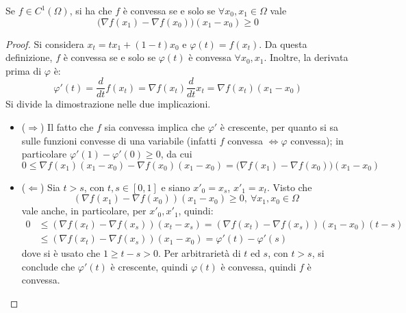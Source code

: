 \documentclass[11pt, a4paper]{scrartcl}
\theoremstyle{definition}
\numberwithin{esempio}{section}
\theoremstyle{definition}
\numberwithin{obs}{section}
\numberwithin{nota}{section}
\numberwithin{equation}{subsection}
\begin{document}
\begin{teorema}
	{}{}
	Se $f \in C^1(\Omega )$, si ha che $f$ \`e convessa se e solo se $\forall x_0,x_1 \in \Omega $ vale
	\[
	\big(\nabla f(x_1) - \nabla f(x_0)\big)(x_1-x_0)\ge 0
	\] 
	\begin{proof}
		Si considera $x_t = tx_1 + (1-t)x_0$ e $\varphi (t) = f(x_t)$.
		Da questa definizione, $f$ \`e convessa se e solo se $\varphi (t)$ \`e convessa $\forall x_0,x_1$.
		Inoltre, la derivata prima di $\varphi $ \`e:
		\[
		\varphi '(t) = \frac{d }{d t} f(x_t) = \nabla f(x_t) \frac{d }{d t} x_t = \nabla f(x_t)(x_1-x_0)
		\] 
		Si divide la dimostrazione nelle due implicazioni.
		\begin{itemize}
			\item ($\Rightarrow $) Il fatto che $f$ sia convessa implica che $\varphi '$ \`e crescente, per quanto si sa sulle funzioni convesse di una variabile (infatti $f$ convessa $\iff \varphi $ convessa); in particolare $\varphi '(1) - \varphi '(0) \ge 0$, da cui
				\[
				0\le \nabla f(x_1) (x_1-x_0) - \nabla f(x_0)(x_1-x_0) = \big(\nabla f(x_1) - \nabla f(x_0)\big)(x_1-x_0)
				\] 
			\item ($\Leftarrow$) Sia $t>s$, con $t,s \in [0,1]$ e siano $x'_0 = x_s$, $x'_1 = x_t$.
				Visto che 
				\[
					(\nabla f (x_1) - \nabla f(x_0))(x_1-x_0) \ge 0, \ \forall x_1,x_0 \in \Omega 
				\] 
				vale anche, in particolare, per $x'_0, x'_1$, quindi:
				\[
				\begin{split}
					0&\le (\nabla f (x_t) - \nabla f(x_s))(x_t-x_s) = (\nabla f(x_t)-\nabla f(x_s))(x_1-x_0)(t-s)\\
					 &\le (\nabla f(x_t) -\nabla f(x_s))(x_1-x_0)= \varphi '(t) - \varphi '(s)
				\end{split}
				\] 
				dove si \`e usato che $1\ge t-s > 0$. Per arbitrariet\`a di $t$ ed $s$, con $t>s$, si conclude che $\varphi '(t)$ \`e crescente, quindi $\varphi (t)$ \`e convessa, quindi $f$ \`e convessa.
		\end{itemize}
	\end{proof}
\end{teorema}
\end{document}
